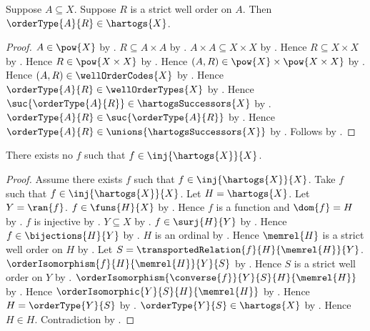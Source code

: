 \begin{proposition}\label{order_type_belongs_to_hartogs}
    Suppose $A\subseteq X$.
    Suppose $R$ is a strict well order on $A$.
    Then $\orderType{A}{R}\in\hartogs{X}$.
\end{proposition}
\begin{proof}
    $A\in\pow{X}$ by .
    $R\subseteq A\times A$
        by .
    $A\times A\subseteq X\times X$
        by .
    Hence $R\subseteq X\times X$ by .
    Hence $R\in\pow{X\times X}$ by .
    Hence $(A,R)\in\pow{X}\times\pow{X\times X}$
        by .
    Hence $(A,R)\in\wellOrderCodes{X}$
        by .
    Hence $\orderType{A}{R}\in\wellOrderTypes{X}$
        by .
    Hence $\suc{\orderType{A}{R}}\in\hartogsSuccessors{X}$
        by .
    $\orderType{A}{R}\in\suc{\orderType{A}{R}}$
        by .
    Hence $\orderType{A}{R}\in\unions{\hartogsSuccessors{X}}$
        by .
    Follows by .
\end{proof}

\begin{theorem}[Hartogs]\label{hartogs_theorem}
    There exists no $f$ such that $f\in\inj{\hartogs{X}}{X}$.
\end{theorem}
\begin{proof}
    Assume there exists $f$ such that $f\in\inj{\hartogs{X}}{X}$.
    Take $f$ such that $f\in\inj{\hartogs{X}}{X}$.
    Let $H=\hartogs{X}$.
    Let $Y=\ran{f}$.
    $f\in\funs{H}{X}$ by .
    Hence $f$ is a function and $\dom{f}=H$
        by .
    $f$ is injective by .
    $Y\subseteq X$ by .
    $f\in\surj{H}{Y}$ by .
    Hence $f\in\bijections{H}{Y}$ by .
    $H$ is an ordinal by .
    Hence $\memrel{H}$ is a strict well order on $H$
        by .
    Let $S=\transportedRelation{f}{H}{\memrel{H}}{Y}$.
    $\orderIsomorphism{f}{H}{\memrel{H}}{Y}{S}$
        by
        .
    Hence $S$ is a strict well order on $Y$
        by .
    $\orderIsomorphism{\converse{f}}{Y}{S}{H}{\memrel{H}}$
        by .
    Hence $\orderIsomorphic{Y}{S}{H}{\memrel{H}}$
        by .
    Hence $H=\orderType{Y}{S}$
        by .
    $\orderType{Y}{S}\in\hartogs{X}$
        by .
    Hence $H\in H$.
    Contradiction by .
\end{proof}

